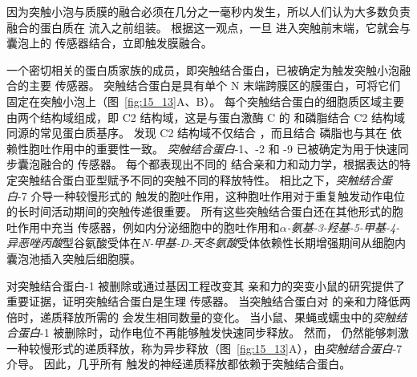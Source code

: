 因为突触小泡与质膜的融合必须在几分之一毫秒内发生，所以人们认为大多数负责融合的蛋白质在  流入之前组装。
根据这一观点，一旦  进入突触前末端，它就会与囊泡上的  传感器结合，立即触发膜融合。


一个密切相关的蛋白质家族的成员，即突触结合蛋白，已被确定为触发突触小泡融合的主要  传感器。
突触结合蛋白是具有单个 N 末端跨膜区的膜蛋白，可将它们固定在突触小泡上（图~\ref{fig:15_13}A、B）。
每个突触结合蛋白的细胞质区域主要由两个结构域组成，即 C2 结构域，这是与蛋白激酶 C 的  和磷脂结合 C2 结构域同源的常见蛋白质基序。
发现 C2 结构域不仅结合 ，而且结合 磷脂也与其在  依赖性胞吐作用中的重要性一致。
\textit{突触结合蛋白}-1、-2 和 -9 已被确定为用于快速同步囊泡融合的  传感器。
每个都表现出不同的  结合亲和力和动力学，根据表达的特定突触结合蛋白亚型赋予不同的突触不同的释放特性。
相比之下，\textit{突触结合蛋白}-7 介导一种较慢形式的  触发的胞吐作用，这种胞吐作用对于重复触发动作电位的长时间活动期间的突触传递很重要。
所有这些突触结合蛋白还在其他形式的胞吐作用中充当  传感器，例如内分泌细胞中的胞吐作用和\textit{$\alpha$-氨基-3-羟基-5-甲基-4-异恶唑丙酸}型谷氨酸受体在\textit{N-甲基-D-天冬氨酸}受体依赖性长期增强期间从细胞内囊泡池插入突触后细胞膜。


对突触结合蛋白-1 被删除或通过基因工程改变其  亲和力的突变小鼠的研究提供了重要证据，证明突触结合蛋白是生理  传感器。
当突触结合蛋白对  的亲和力降低两倍时，递质释放所需的  会发生相同数量的变化。
当小鼠、果蝇或蠕虫中的\textit{突触结合蛋白}-1 被删除时，动作电位不再能够触发快速同步释放。
然而， 仍然能够刺激一种较慢形式的递质释放，称为异步释放（图~\ref{fig:15_13}A），由\textit{突触结合蛋白}-7 介导。
因此，几乎所有  触发的神经递质释放都依赖于突触结合蛋白。



